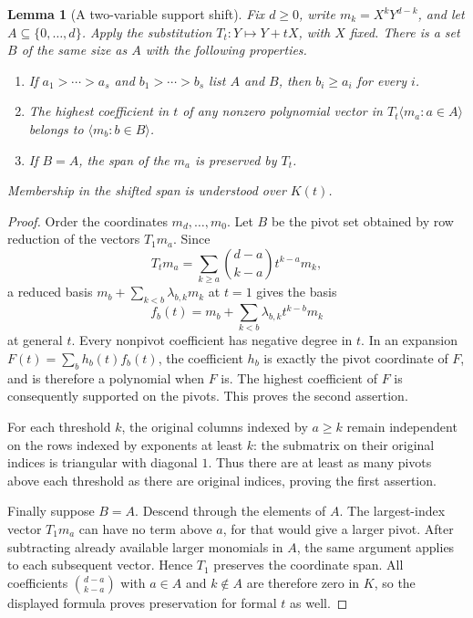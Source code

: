 \documentclass[11pt]{article}
\numberwithin{equation}{section}
\newtheorem{lemma}[theorem]{Lemma}
\theoremstyle{definition}\newtheorem{definition}[theorem]{Definition}
\theoremstyle{remark}\newtheorem{remark}[theorem]{Remark}
\begin{document}
\begin{lemma}[A two-variable support shift]\label{lem:two-variable-shift}
Fix $d\ge0$, write $m_k=X^kY^{d-k}$, and let $A\subseteq\{0,\ldots,d\}$.
Apply the substitution $T_t:Y\mapsto Y+tX$, with $X$ fixed.
There is a set $B$ of the same size as $A$ with the following properties.
\begin{enumerate}
\item If $a_1>\cdots>a_s$ and $b_1>\cdots>b_s$ list $A$ and $B$,
then $b_i\ge a_i$ for every $i$.
\item The highest coefficient in $t$ of any nonzero polynomial vector
in $T_t\langle m_a:a\in A\rangle$ belongs to
$\langle m_b:b\in B\rangle$.
\item If $B=A$, the span of the $m_a$ is preserved by $T_t$.
\end{enumerate}
Membership in the shifted span is understood over $K(t)$.
\end{lemma}
\begin{proof}
Order the coordinates $m_d,\ldots,m_0$. Let $B$ be the pivot set
obtained by row reduction of the vectors $T_1m_a$. Since
\[
 T_tm_a=\sum_{k\ge a}\binom{d-a}{k-a}t^{k-a}m_k,
\]
a reduced basis $m_b+\sum_{k<b}\lambda_{b,k}m_k$ at $t=1$
gives the basis
\[
 f_b(t)=m_b+\sum_{k<b}\lambda_{b,k}t^{k-b}m_k
\]
at general $t$. Every nonpivot coefficient has negative degree in $t$.
In an expansion $F(t)=\sum_bh_b(t)f_b(t)$, the coefficient $h_b$
is exactly the pivot coordinate of $F$, and is therefore a polynomial
when $F$ is. The highest coefficient of $F$ is consequently supported
on the pivots. This proves the second assertion.

For each threshold $k$, the original columns indexed by $a\ge k$
remain independent on the rows indexed by exponents at least $k$:
the submatrix on their original indices is triangular with diagonal
$1$. Thus there are at least as many pivots above each threshold
as there are original indices, proving the first assertion.

Finally suppose $B=A$. Descend through the elements of $A$.
The largest-index vector $T_1m_a$ can have no term above $a$,
for that would give a larger pivot. After subtracting already
available larger monomials in $A$, the same argument applies to
each subsequent vector. Hence $T_1$ preserves the coordinate span.
All coefficients $\binom{d-a}{k-a}$ with $a\in A$ and $k\notin A$
are therefore zero in $K$, so the displayed formula proves
preservation for formal $t$ as well.
\end{proof}
\end{document}
